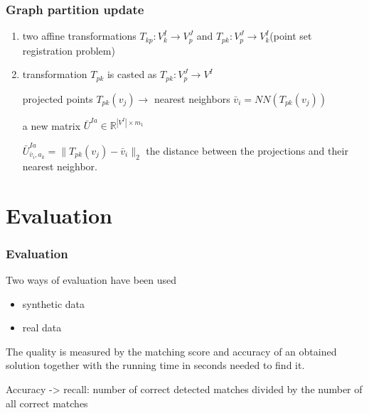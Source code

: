 \documentclass[handout]{beamer}
\begin{document}
\begin{frame}
\frametitle{Graph partition update}
\begin{enumerate}
\item two affine transformations $T_{kp}:V^I_k\rightarrow V^J_p$ and $T_{pk}:V^J_p\rightarrow V^I_k$(point set registration problem)
\item transformation $T_{pk}$ is casted as $T_{pk}:V^J_p\rightarrow V^I$

 projected points $T_{pk}(v_j) \rightarrow$ nearest neighbors $\bar{v}_i=NN(T_{pk}(v_j))$ 
 
 a new matrix $\bar{U}^{Ia}\in\mathbb{R}^{|V^I|\times m_1}$ 
 
 $\bar{U}^{Ia}_{\bar{v}_i,a_k}=\|T_{pk}(v_j)-\bar{v}_i\|_2$ the distance between the projections and their nearest neighbor.
\end{enumerate}
\end{frame}
\section{Evaluation} 
\begin{frame}
\frametitle{Evaluation}
Two ways of evaluation have been used
\begin{itemize}
\item synthetic data
\item real data
\end{itemize}
The quality is measured by the matching score and accuracy of an obtained solution together
with the running time in seconds needed to find it.


Accuracy -> recall: number of correct detected matches divided by the number of all correct matches
\end{frame}
\end{document}
